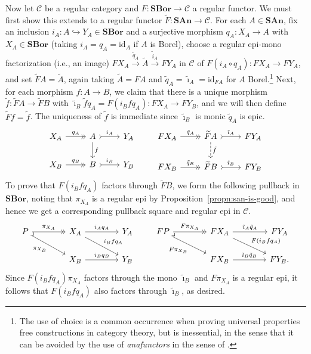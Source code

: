 \documentclass[11pt]{amsart}
\newcommand\cC{\mathcal{C}}
\newcommand\hto{\hookrightarrow}
\newcommand\id{\mathrm{id}}
\newcommand\pb[1][rd]{\ar[#1, phantom, "\lrcorner", pos=0]}
\newcommand\SAn{\mathbf{SAn}}
\newcommand\SBor{\mathbf{SBor}}
\newcommand\tildei{\tilde\imath}
\newcommand\tox[2][]{\xrightarrow[#1]{#2}}
\newcommand\wt[1]{\widetilde{#1}}
\theoremstyle{definition}
\theoremstyle{remark}
\theoremstyle{plain}
\begin{document}
Now let \( \cC \) be a regular category and \( F \colon \SBor \to \cC \) a regular functor.
We must first show this extends to a regular functor \( \wt F \colon \SAn \to \cC \).
For each \( A \in \SAn \), fix an inclusion \( i_A \colon A \hto Y_A \in \SBor \) and a surjective morphism \( q_A \colon X_A \to A \) with \( X_A \in \SBor \) (taking \( i_A = q_A = \id_A \) if \( A \) is Borel), choose a regular epi-mono factorization (i.e., an image) \( F X_A \tox{\tilde q_A} \wt A \tox{\tilde i_A} F Y_A  \) in \( \cC \) of \( F(i_A \circ q_A) \colon F X_A \to F Y_A \), and set \( \wt F A = \wt A \), again taking \( \wt A = F A \) and \( \tilde q_A = \tildei_A = \id_{F A} \) for \( A \) Borel.\footnote{
  The use of choice is a common occurrence when proving universal properties free constructions in category theory, but is inessential, in the sense that it can be avoided by the use of \emph{anafunctors} in the sense of \cite{makkai-avoiding-choice}.
}
Next, for each morphism \( f \colon A \to B \), we claim that there is a unique morphism \( \tilde f \colon \wt F A \to \wt F B \) with \( \tildei_B \tilde f q_A = F(i_B f q_A) \colon F X_A \to F Y_B \), and we will then define \( \wt F f = \tilde f \).
The uniqueness of \( \tilde f \) is immediate since \( \tildei_B \) is monic \( \tilde q_A \) is epic.
\[
  \begin{tikzcd}
    X_A \ar[r, "q_A", ->>] & A \ar[r, "i_A", >->] \ar[d, "f"] & Y_A \\
    X_B \ar[r, "q_B", ->>] & B \ar[r, "i_B", >->] & Y_B
  \end{tikzcd}
  \qquad
  \begin{tikzcd}
    F X_A \ar[r, "\tilde q_A", ->>] & \wt F A \ar[r, "\tildei_A", >->] \ar[d, "\tilde f", dashed] & F Y_A \\
    F X_B \ar[r, "\tilde q_B", ->>] & \wt F B \ar[r, "\tildei_B", >->] & F Y_B
  \end{tikzcd}
\]
To prove that \( F(i_B f q_A) \) factors through \( \wt F B \), we form the following pullback in \( \SBor \), noting that \( \pi_{X_A} \) is a regular epi by Proposition~\ref{propn:san-is-good}, and hence we get a corresponding pullback square and regular epi in \( \cC \).
\begin{equation} \label{eq:san-sbor-pbs}
  \begin{tikzcd}[column sep=40pt]
    P \pb[rrd] \ar[r, "\pi_{X_A}", ->>] \ar[rd, "\pi_{X_B}"'] & X_A \ar[r, "i_A q_A"] \ar[rd, "i_B f q_A"] & Y_A \\
    & X_B \ar[r, "i_B q_B"] & Y_B
  \end{tikzcd}
  \qquad
  \begin{tikzcd}[column sep=40pt]
    F P \pb[rrd] \ar[r, "F \pi_{X_A}", ->>] \ar[rd, "F \pi_{X_B}"'] & F X_A \ar[r, "\tildei_A \tilde q_A"] \ar[rd, "F(i_B f q_A)"] & F Y_A \\
    & F X_B \ar[r, "\tildei_B \tilde q_B"] & F Y_B.
  \end{tikzcd}
\end{equation}
Since \( F(i_B f q_A) \pi_{X_A} \) factors through the mono \( \tildei_B \) and \( F \pi_{X_A} \) is a regular epi, it follows that \( F(i_B f q_A) \) also factors through \( \tildei_B \), as desired.
\end{document}
